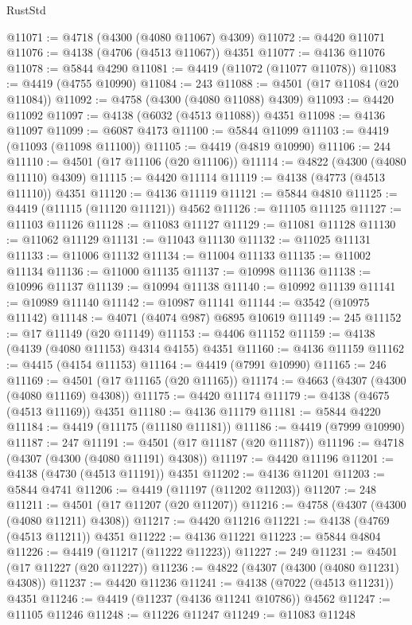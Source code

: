 \begin{lexlean}{RustStd}
\begin{coremodule}
@11071 := @4718 (@4300 (@4080 @11067) @4309)
@11072 := @4420 @11071
@11076 := @4138 (@4706 (@4513 @11067)) @4351
@11077 := @4136 @11076
@11078 := @5844 @4290
@11081 := @4419 (@11072 (@11077 @11078))
@11083 := @4419 (@4755 @10990)
@11084 := 243
@11088 := @4501 (@17 @11084 (@20 @11084))
@11092 := @4758 (@4300 (@4080 @11088) @4309)
@11093 := @4420 @11092
@11097 := @4138 (@6032 (@4513 @11088)) @4351
@11098 := @4136 @11097
@11099 := @6087 @4173
@11100 := @5844 @11099
@11103 := @4419 (@11093 (@11098 @11100))
@11105 := @4419 (@4819 @10990)
@11106 := 244
@11110 := @4501 (@17 @11106 (@20 @11106))
@11114 := @4822 (@4300 (@4080 @11110) @4309)
@11115 := @4420 @11114
@11119 := @4138 (@4773 (@4513 @11110)) @4351
@11120 := @4136 @11119
@11121 := @5844 @4810
@11125 := @4419 (@11115 (@11120 @11121)) @4562
@11126 := @11105 @11125
@11127 := @11103 @11126
@11128 := @11083 @11127
@11129 := @11081 @11128
@11130 := @11062 @11129
@11131 := @11043 @11130
@11132 := @11025 @11131
@11133 := @11006 @11132
@11134 := @11004 @11133
@11135 := @11002 @11134
@11136 := @11000 @11135
@11137 := @10998 @11136
@11138 := @10996 @11137
@11139 := @10994 @11138
@11140 := @10992 @11139
@11141 := @10989 @11140
@11142 := @10987 @11141
@11144 := @3542 (@10975 @11142)
@11148 := @4071 (@4074 @987) @6895 @10619
@11149 := 245
@11152 := @17 @11149 (@20 @11149)
@11153 := @4406 @11152
@11159 := @4138 (@4139 (@4080 @11153) @4314 @4155) @4351
@11160 := @4136 @11159
@11162 := @4415 (@4154 @11153)
@11164 := @4419 (@7991 @10990)
@11165 := 246
@11169 := @4501 (@17 @11165 (@20 @11165))
@11174 := @4663 (@4307 (@4300 (@4080 @11169) @4308))
@11175 := @4420 @11174
@11179 := @4138 (@4675 (@4513 @11169)) @4351
@11180 := @4136 @11179
@11181 := @5844 @4220
@11184 := @4419 (@11175 (@11180 @11181))
@11186 := @4419 (@7999 @10990)
@11187 := 247
@11191 := @4501 (@17 @11187 (@20 @11187))
@11196 := @4718 (@4307 (@4300 (@4080 @11191) @4308))
@11197 := @4420 @11196
@11201 := @4138 (@4730 (@4513 @11191)) @4351
@11202 := @4136 @11201
@11203 := @5844 @4741
@11206 := @4419 (@11197 (@11202 @11203))
@11207 := 248
@11211 := @4501 (@17 @11207 (@20 @11207))
@11216 := @4758 (@4307 (@4300 (@4080 @11211) @4308))
@11217 := @4420 @11216
@11221 := @4138 (@4769 (@4513 @11211)) @4351
@11222 := @4136 @11221
@11223 := @5844 @4804
@11226 := @4419 (@11217 (@11222 @11223))
@11227 := 249
@11231 := @4501 (@17 @11227 (@20 @11227))
@11236 := @4822 (@4307 (@4300 (@4080 @11231) @4308))
@11237 := @4420 @11236
@11241 := @4138 (@7022 (@4513 @11231)) @4351
@11246 := @4419 (@11237 (@4136 @11241 @10786)) @4562
@11247 := @11105 @11246
@11248 := @11226 @11247
@11249 := @11083 @11248

\end{coremodule}
\end{lexlean}

